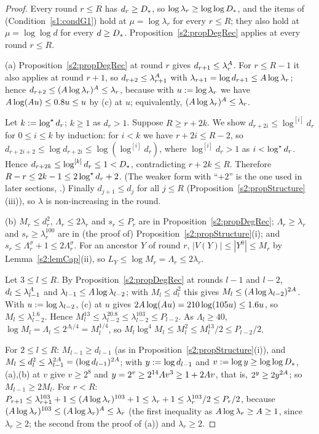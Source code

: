 \begin{proof}
Every round $r\le R$ has $d_r\ge D_{*}$, so $\log\lambda_r\ge\log\log D_{*}$, and
the items of  (Condition~\ref{s1:condG1}) hold at $\mu=\log\lambda_r$ for
every $r\le R$; they also hold at $\mu=\log\log d$ for every $d\ge D_{*}$. Proposition~\ref{s2:propDegRec} applies at every round $r\le R$.

(a) Proposition~\ref{s2:propDegRec} at round $r$ gives $d_{r+1}\le
\lambda_r^{A}$. For $r\le R-1$ it also applies at round $r+1$, so
$d_{r+2}\le\lambda_{r+1}^{A}$ with $\lambda_{r+1}=\log d_{r+1}\le A\log
\lambda_r$; hence $d_{r+2}\le(A\log\lambda_r)^{A}\le\lambda_r$, because
with $u\mathrel{:=}\log\lambda_r$ we have $A\log(A u)\le0.8u\le u$ by (c)
at $u$; equivalently, $(A\log\lambda_r)^{A}\le\lambda_r$.

Let $k\mathrel{:=}\log^{\star} d_r$; $k\ge1$ as $d_r>1$. Suppose $R\ge r+2k$. We show
$d_{r+2i}\le\log^{[i]}d_r$ for $0\le i\le k$ by induction: for $i<k$ we have
$r+2i\le R-2$, so $d_{r+2i+2}\le\log d_{r+2i}\le\log(\log^{[i]}d_r)$, where
$\log^{[i]}d_r>1$ as $i<\log^{\star} d_r$. Hence $d_{r+2k}\le\log^{[k]}d_r\le1<D_{*}$,
contradicting $r+2k\le R$. Therefore $R-r\le2k-1\le2\log^{\star} d_r+2$. (The weaker
form with ``$+2$'' is the one used in later sections, .) Finally
$d_{j+1}\le d_j$ for all $j\le R$ (Proposition~\ref{s2:propStructure}(iii)), so
$\lambda$ is non-increasing in the round.

(b) $M_r\le d_r^2$, $\Lambda_r\le2\lambda_r$ and $s_r\le P_r$ are in
Proposition~\ref{s2:propDegRec}; $\Lambda_r\ge\lambda_r$ and
$s_r\ge\lambda_r^{100}$ are in (the proof of)
Proposition~\ref{s2:propStructure}(i); and $s_r\le\Lambda_r^\sigma+1\le
2\Lambda_r^\sigma$. For an ancestor $Y$ of round $r$, $|V(Y)|\le|Y^0|\le M_r$
by Lemma~\ref{s2:lemCap}(ii), so $L_Y\le\log M_r=\Lambda_r\le2\lambda_r$.

Let $3\le l\le R$. By Proposition~\ref{s2:propDegRec} at rounds $l-1$ and
$l-2$, $d_l\le\lambda_{l-1}^{A}$ and $\lambda_{l-1}\le A\log
\lambda_{l-2}$; with $M_l\le d_l^2$ this gives
$M_l\le(A\log\lambda_{l-2})^{2A}$. With $u\mathrel{:=}\log\lambda_{l-2}$, (c) at $u$ gives
$2A\log(A u)=210\log(105u)\le1.6u$, so
$M_l\le\lambda_{l-2}^{1.6}$. Hence $M_l^{13}\le\lambda_{l-2}^{20.8}\le
\lambda_{l-2}^{103}\le P_{l-2}$. As $\Lambda_l\ge40$, $\log M_l=\Lambda_l\le
2^{\Lambda_l/4}=M_l^{1/4}$, so $M_l\log^4M_l\le M_l^2\le M_l^{13}/2\le
P_{l-2}/2$.

For $2\le l\le R$: $M_{l-1}\ge d_{l-1}$ (as in
Proposition~\ref{s2:propStructure}(i)), and $M_l\le d_l^2\le
\lambda_{l-1}^{2A}=(\log d_{l-1})^{2A}$; with $y\mathrel{:=}\log d_{l-1}$ and $v\mathrel{:=}\log y\ge\log\log D_{*}$, (a),(b) at $v$
give $v\ge2^8$ and $y=2^v\ge2^{14}A v^3\ge1+2A v$, that is, $2^y\ge2y^{2A}$; so
$M_{l-1}\ge2M_l$. For $r<R$:
$P_{r+1}\le\lambda_{r+1}^{103}+1\le(A\log\lambda_r)^{103}+1\le\lambda_r+1\le
\lambda_r^{103}/2\le P_r/2$, because
$(A\log\lambda_r)^{103}\le(A\log\lambda_r)^{A}\le\lambda_r$ (the
first inequality as $A\log\lambda_r\ge A\ge1$, since $\lambda_r\ge2$; the
second from the proof of (a)) and $\lambda_r\ge2$.


\end{proof}
